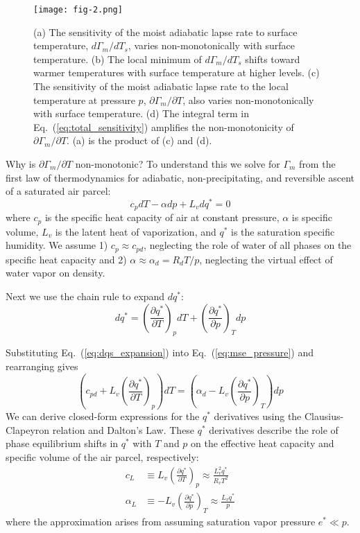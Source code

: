 \documentclass[draft,twocol]{ametsocV6.1}
\begin{document}
\begin{figure*}[htbp]
 \centering
 \texttt{[image: fig-2.png]}\\
 \caption{(a) The sensitivity of the moist adiabatic lapse rate to surface temperature, $d\Gamma_m/d T_s$, varies non-monotonically with surface temperature. (b) The local minimum of $d\Gamma_m/d T_s$ shifts toward warmer temperatures with surface temperature at higher levels. (c) The sensitivity of the moist adiabatic lapse rate to the local temperature at pressure $p$, $\partial\Gamma_m/\partial T$, also varies non-monotonically with surface temperature. (d) The integral term in Eq.~(\ref{eq:total_sensitivity}) amplifies the non-monotonicity of $\partial\Gamma_m/\partial T$. (a) is the product of (c) and (d).}\label{fig:fig-2}
\end{figure*}

Why is $\partial\Gamma_m/\partial T$ non-monotonic? To understand this we solve for $\Gamma_m$ from the first law of thermodynamics for adiabatic, non-precipitating, and reversible ascent of a saturated air parcel:
\begin{equation}
c_{p} dT - \alpha dp + L_v dq^* = 0 \label{eq:mse_pressure}
\end{equation}
where $c_{p}$ is the specific heat capacity of air at constant pressure, $\alpha$ is specific volume, $L_v$ is the latent heat of vaporization, and $q^*$ is the saturation specific humidity. We assume 1) $c_p \approx c_{pd}$, neglecting the role of water of all phases on the specific heat capacity and 2) $\alpha \approx \alpha_d = R_d T/p$, neglecting the virtual effect of water vapor on density. 

Next we use the chain rule to expand $dq^*$:
\begin{equation}
dq^* = \left(\frac{\partial q^*}{\partial T}\right)_p dT + \left(\frac{\partial q^*}{\partial p}\right)_T dp \label{eq:dqs_expansion}
\end{equation}

Substituting Eq.~(\ref{eq:dqs_expansion}) into Eq.~(\ref{eq:mse_pressure}) and rearranging gives
\begin{equation}
\left(c_{pd} + L_v\left(\frac{\partial q^*}{\partial T}\right)_p \right)dT = \left(\alpha_d - L_v\left(\frac{\partial q^*}{\partial p}\right)_T\right)dp \label{eq:rearranged}
\end{equation}
We can derive closed-form expressions for the $q^*$ derivatives using the Clausius-Clapeyron relation and Dalton's Law. These $q^*$ derivatives describe the role of phase equilibrium shifts in $q^*$ with $T$ and $p$ on the effective heat capacity and specific volume of the air parcel, respectively:
\begin{align}
c_L &\equiv L_v\left(\frac{\partial q^*}{\partial T}\right)_p \approx \frac{L_v^2 q^*}{R_v T^2}
\label{eq:c_L} \\
\alpha_L &\equiv -L_v\left(\frac{\partial q^*}{\partial p}\right)_T \approx \frac{L_v q^*}{p}
\label{eq:alpha_L}
\end{align}
where the approximation arises from assuming saturation vapor pressure $e^* \ll p$.
\end{document}
